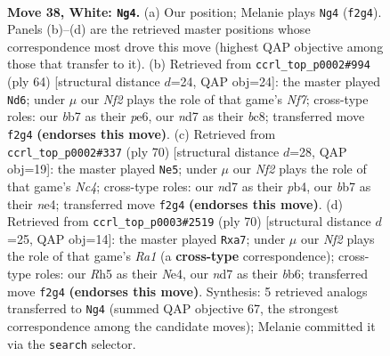 \documentclass[11pt]{article}
\begin{document}
\clearpage

\begin{figure}[p]\centering
\begin{subfigure}{0.46\textwidth}\centering
\resizebox{\linewidth}{!}{%
\newchessgame
\chessboard[
  setfen={5rk1/1b1n4/8/3p3R/p7/P5P1/1PP2N2/2K5 w - - 10 38},
  showmover=false,
  pgfstyle=straightmove, color=movearrow, markmove={f2-g4}
]}
\caption{}
\end{subfigure}\hfill
\begin{subfigure}{0.46\textwidth}\centering
\resizebox{\linewidth}{!}{%
\newchessgame
\chessboard[
  setfen={1kb5/1r3Npp/p3p3/8/7P/4P3/5PP1/R5K1 w - - 1 33},
  showmover=false,
  pgfstyle=straightmove, color=movearrow, markmove={f7-d6}
]}
\caption{}
\end{subfigure}
\\[4pt]
\begin{subfigure}{0.46\textwidth}\centering
\resizebox{\linewidth}{!}{%
\newchessgame
\chessboard[
  setfen={2r2k2/R5p1/6p1/8/1pN1n2p/1P5P/6PK/8 w - - 0 36},
  showmover=false,
  pgfstyle=straightmove, color=movearrow, markmove={c4-e5}
]}
\caption{}
\end{subfigure}\hfill
\begin{subfigure}{0.46\textwidth}\centering
\resizebox{\linewidth}{!}{%
\newchessgame
\chessboard[
  setfen={5k2/r5p1/1b6/5P1p/4N3/5KP1/7P/R7 w - - 1 36},
  showmover=false,
  pgfstyle=straightmove, color=movearrow, markmove={a1-a7}
]}
\caption{}
\end{subfigure}
\caption{\textbf{Move 38, White: \texttt{Ng4}.} (a) Our position; Melanie plays \texttt{Ng4} (\texttt{f2g4}). Panels (b)--(d) are the retrieved master positions whose correspondence most drove this move (highest QAP objective among those that transfer to it). (b) Retrieved from \texttt{ccrl\_top\_p0002\#994} (ply 64) [structural distance $d$=24, QAP obj=24]: the master played \texttt{Nd6}; under $\mu$ our \emph{Nf2} plays the role of that game's \emph{Nf7}; cross-type roles: our \emph{b}b7 as their \emph{p}e6, our \emph{n}d7 as their \emph{b}c8; transferred move \texttt{f2g4} \textbf{(endorses this move)}. (c) Retrieved from \texttt{ccrl\_top\_p0002\#337} (ply 70) [structural distance $d$=28, QAP obj=19]: the master played \texttt{Ne5}; under $\mu$ our \emph{Nf2} plays the role of that game's \emph{Nc4}; cross-type roles: our \emph{n}d7 as their \emph{p}b4, our \emph{b}b7 as their \emph{n}e4; transferred move \texttt{f2g4} \textbf{(endorses this move)}. (d) Retrieved from \texttt{ccrl\_top\_p0003\#2519} (ply 70) [structural distance $d$=25, QAP obj=14]: the master played \texttt{Rxa7}; under $\mu$ our \emph{Nf2} plays the role of that game's \emph{Ra1} (a \textbf{cross-type} correspondence); cross-type roles: our \emph{R}h5 as their \emph{N}e4, our \emph{n}d7 as their \emph{b}b6; transferred move \texttt{f2g4} \textbf{(endorses this move)}. Synthesis: 5 retrieved analogs transferred to \texttt{Ng4} (summed QAP objective 67, the strongest correspondence among the candidate moves); Melanie committed it via the \texttt{search} selector.}
\label{fig:thought-m74}
\end{figure}
\end{document}
